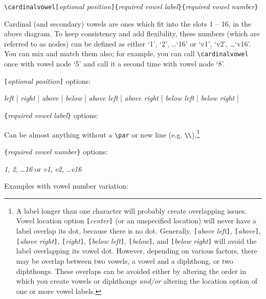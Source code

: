 \documentclass{article}
\begin{document}
\medskip
\qquad \verb+\cardinalvowel[+\textit{optional position}\verb+]{+\textit{required vowel label}\verb+}{+\textit{required vowel number}\verb+}+
\bigskip

Cardinal (and secondary) vowels are ones which fit into the slots 1 -- 16, in the above diagram.  To keep consistency and add flexibility, these numbers (which are referred to as nodes) can be defined as either `1', `2', \dots `16' or `v1', `v2', \dots `v16'.  You can mix and match them also; for example, you can call \verb|\cardinalvowel| once with vowel node `5' and call it a second time with vowel node `8'.

\bigskip

\texttt{[}\textit{optional position}\texttt{]} options:

\qquad \textit{left} | 
\textit{right} | 
\textit{above} | 
\textit{below} | 
\textit{above left} | 
\textit{above right} | 
\textit{below left} | 
\textit{below right} | 

\bigskip

\texttt{\{}\textit{required vowel label}\texttt{\}} options:

\qquad Can be almost anything without a \verb|\par| or new line (e.g. \verb+\\+).\footnote{A label longer than one character will probably create overlapping issues.  Vowel location option \texttt{[}\textit{center}\texttt{]} (or an unspecified location) will never have a label overlap its dot, because there is no dot.  Generally, \texttt{[}\textit{above left}\texttt{]}, \texttt{[}\textit{above}\texttt{]}, \texttt{[}\textit{above right}\texttt{]}, \texttt{[}\textit{right}\texttt{]}, \texttt{[}\textit{below left}\texttt{]}, \texttt{[}\textit{below}\texttt{]}, and \texttt{[}\textit{below right}\texttt{]} will avoid the label overlapping its vowel dot.  However, depending on various factors, there may be overlap between two vowels, a vowel and a diphthong, or two diphthongs.  These overlaps can be avoided either by altering the order in which you create vowels or diphthongs \textit{and/or} altering the location option of one or more vowel labels.}

\bigskip

\texttt{\{}\textit{required vowel number}\texttt{\}} options:

\qquad \textit{1}, \textit{2}, \dots \textit{16} or \textit{v1}, \textit{v2}, \dots \textit{v16}

\bigskip
\noindent
Examples with vowel number variation:
\end{document}

